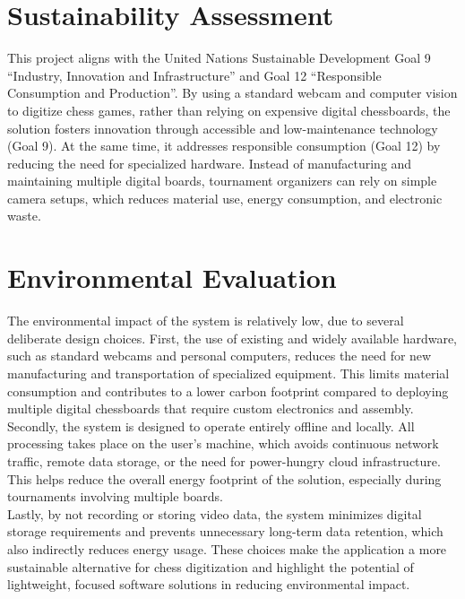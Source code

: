 
\section{Sustainability Assessment}
This project aligns with the United Nations Sustainable Development Goal 9 “Industry, Innovation and Infrastructure” and Goal 12 “Responsible Consumption and Production”. By using a standard webcam and computer vision to digitize chess games, rather than relying on expensive digital chessboards, the solution fosters innovation through accessible and low-maintenance technology (Goal 9). At the same time, it addresses responsible consumption (Goal 12) by reducing the need for specialized hardware. Instead of manufacturing and maintaining multiple digital boards, tournament organizers can rely on simple camera setups, which reduces material use, energy consumption, and electronic waste.

\section{Environmental Evaluation}
The environmental impact of the system is relatively low, due to several deliberate design choices. First, the use of existing and widely available hardware, such as standard webcams and personal computers, reduces the need for new manufacturing and transportation of specialized equipment. This limits material consumption and contributes to a lower carbon footprint compared to deploying multiple digital chessboards that require custom electronics and assembly. \\

Secondly, the system is designed to operate entirely offline and locally. All processing takes place on the user's machine, which avoids continuous network traffic, remote data storage, or the need for power-hungry cloud infrastructure. This helps reduce the overall energy footprint of the solution, especially during tournaments involving multiple boards. \\

Lastly, by not recording or storing video data, the system minimizes digital storage requirements and prevents unnecessary long-term data retention, which also indirectly reduces energy usage. These choices make the application a more sustainable alternative for chess digitization and highlight the potential of lightweight, focused software solutions in reducing environmental impact.
